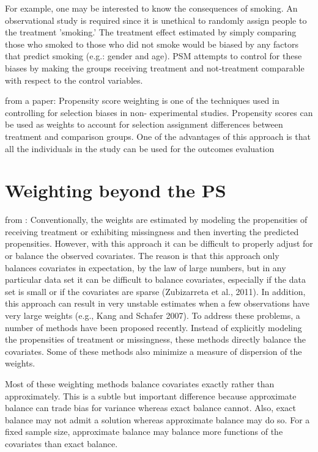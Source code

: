 For example, one may be interested to know the consequences of smoking. An observational study is required since it is unethical to randomly assign people to the treatment 'smoking.' The treatment effect estimated by simply comparing those who smoked to those who did not smoke would be biased by any factors that predict smoking (e.g.: gender and age). PSM attempts to control for these biases by making the groups receiving treatment and not-treatment comparable with respect to the control variables. 

from a paper:
Propensity score weighting is one of the techniques used in controlling for selection biases in non-
experimental studies. Propensity scores can be used as weights to account for selection assignment
differences between treatment and comparison groups. One of the advantages of this approach is
that all the individuals in the study can be used for the outcomes evaluation


\section{Weighting beyond the PS}
from \cite{Wang2019}:
Conventionally, the weights are estimated by modeling the propensities of receiving treatment or exhibiting missingness and then inverting the predicted propensities. However, with this approach it can be difficult to properly adjust for or balance the observed covariates. The reason is that this approach only balances covariates in expectation, by the law of large numbers, but in any particular data set it can be difficult to balance covariates, especially if the data set is small or if the covariates are sparse (Zubizarreta et al., 2011). In addition, this approach can result in very unstable estimates when a few observations have very large weights (e.g., Kang and Schafer 2007). To address these problems, a number of methods have been proposed recently. Instead of explicitly modeling the propensities of treatment or missingness, these methods directly balance the covariates. Some of these methods also minimize a measure of dispersion of the weights.

Most of these weighting methods balance covariates exactly rather than approximately. This is a subtle but important difference because approximate balance can trade bias for variance whereas exact balance cannot. Also, exact balance may not admit a solution whereas approximate balance may do so. For a fixed sample size, approximate balance may balance more functions of the covariates than exact balance.
